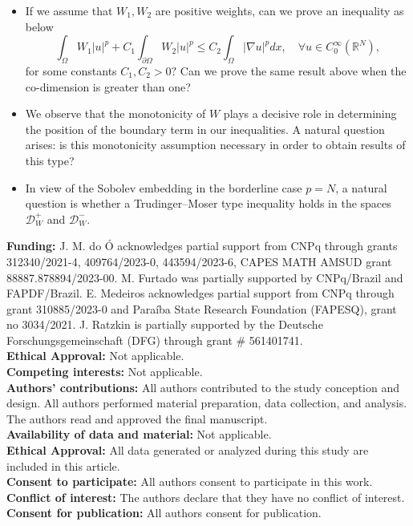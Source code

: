 \documentclass[12pt]{amsart}
\theoremstyle{definition}
\theoremstyle{plain}
\begin{document}
\begin{itemize}
\item If we assume that $W_1,W_2$ are positive weights, can we prove an inequality as below
$$
    \int_{\Omega} W_1 |u|^p + C_1\int_{\partial\Omega} W_2 |u|^p\leq C_2\int_{\Omega}  |\nabla u|^pdx, \quad \forall u\in C_0^\infty(\mathbb{R}^N),
$$
for some constants $C_1, C_2>0?$
Can we prove the same result above when the co-dimension is greater than one?\\

\item We observe that the monotonicity of \( W \) plays a decisive role in determining the position of the boundary term in our inequalities. A natural question arises: is this monotonicity assumption necessary in order to obtain results of this type?\\

\item In view of the Sobolev embedding in the borderline case $p = N$, a natural question is whether a Trudinger--Moser type inequality holds in the spaces $\mathcal{D}_W^{+}$ and $\mathcal{D}_W^{-}$.



\end{itemize}
\bigskip

\begin{flushleft}
	{\bf Funding:}  
	J. M. do \'O acknowledges partial support from CNPq through grants 312340/2021-4, 
    409764/2023-0, 443594/2023-6, CAPES MATH AMSUD grant 88887.878894/2023-00. 
    M. Furtado was partially supported by CNPq/Brazil and FAPDF/Brazil.
    E. Medeiros acknowledges partial support from CNPq through grant 310885/2023-0 
    and Para\'iba State Research Foundation (FAPESQ), grant no 3034/2021. 
    J. Ratzkin is partially 
    supported by the Deutsche Forschungsgemeinschaft (DFG) through grant \# 561401741.\\
	{\bf Ethical Approval:}  Not applicable.\\
	{\bf Competing interests:}  Not applicable. \\
	{\bf Authors' contributions:}    All authors contributed to the study conception 
    and design. All authors performed material preparation, data collection, and analysis. 
    The authors read and approved the final manuscript.\\
	{\bf Availability of data and material:}  Not applicable.\\
	{\bf Ethical Approval:}  All data generated or analyzed during this study are 
    included in this article.\\
	{\bf Consent to participate:}  All authors consent to participate in this work.\\
	{\bf Conflict of interest:} The authors declare that they have no conflict of interest. \\
	{\bf Consent for publication:}  All authors consent for publication. \\
\end{flushleft}


	

%


\end{document}
